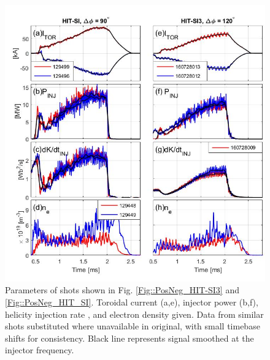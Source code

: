 \begin{figure}
\includegraphics[width=6in]{Jscope5.jpg}\caption{Parameters of shots shown in Fig. \ref{Fig::PosNeg_HIT-SI3} and \ref{Fig::PosNeg_HIT_SI}. Toroidal current (a,e), injector power (b,f), helicity injection rate , and electron density given. Data from similar shots substituted where unavailable in original, with small timebase shifts for consistency. Black line represents signal smoothed at the injector frequency.}\label{Fig::Jscope}
\end{figure}

